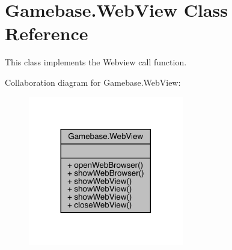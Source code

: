 \hypertarget{classcom_1_1toast_1_1android_1_1gamebase_1_1_gamebase_1_1_web_view}{}\section{Gamebase.\+Web\+View Class Reference}
\label{classcom_1_1toast_1_1android_1_1gamebase_1_1_gamebase_1_1_web_view}


This class implements the Webview call function.  




Collaboration diagram for Gamebase.\+Web\+View\+:\nopagebreak
\begin{figure}[H]
\begin{center}
\leavevmode
\includegraphics[width=192pt]{classcom_1_1toast_1_1android_1_1gamebase_1_1_gamebase_1_1_web_view__coll__graph}
\end{center}
\end{figure}
